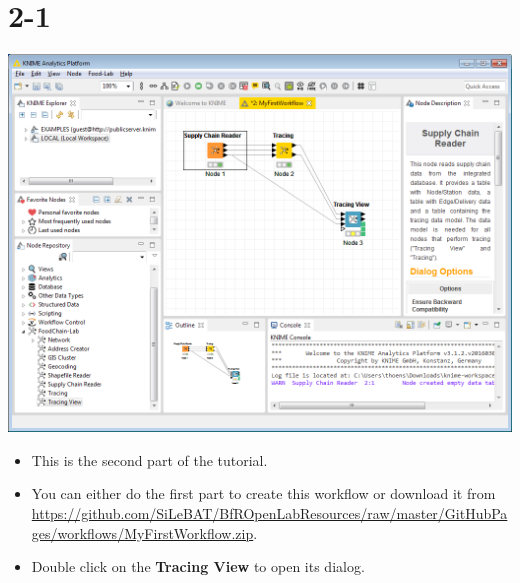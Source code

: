 \documentclass{beamer}
\begin{document}
\section{2-1}
\begin{frame}
	\begin{center}
  		\includegraphics[height=0.6\textheight]{2-1.png}
	\end{center}
	\begin{itemize}
		\item This is the second part of the tutorial.
		\item You can either do the first part to create this workflow or download it from \url{https://github.com/SiLeBAT/BfROpenLabResources/raw/master/GitHubPages/workflows/MyFirstWorkflow.zip}.
		\item Double click on the \textbf{Tracing View} to open its dialog.
	\end{itemize}
\end{frame}
\end{document}
